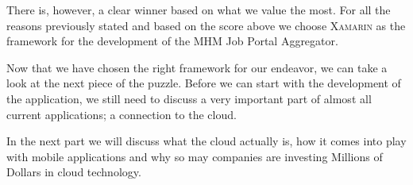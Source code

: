 There is, however, a clear winner based on what we value the most. For all the reasons previously stated and based on the score above we choose \textsc{Xamarin} as the framework for the development of the MHM Job Portal Aggregator.
\newline


Now that we have chosen the right framework for our endeavor, we can take a look at the next piece of the puzzle. Before we can start with the development of the application, we still need to discuss a very important part of almost all current applications; a connection to the cloud. 

In the next part we will discuss what the cloud actually is, how it comes into play with mobile applications and why so may companies are investing Millions of Dollars in cloud technology. 